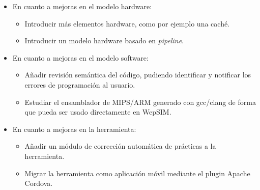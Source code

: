 \begin{itemize}

\item En cuanto a mejoras en el modelo hardware:

\begin{itemize}

\item Introducir más elementos hardware, como por ejemplo una caché.

\item Introducir un modelo hardware basado en \textit{pipeline}. 

\end{itemize}

\item En cuanto a mejoras en el modelo software:

\begin{itemize}

\item Añadir revisión semántica del código, pudiendo identificar y notificar los errores de programación al usuario.

\item Estudiar el ensamblador de MIPS/ARM generado con gcc/clang de forma que pueda ser usado directamente en WepSIM.

\end{itemize}

\item En cuanto a mejoras en la herramienta:

\begin{itemize}

\item Añadir un módulo de corrección automática de prácticas a la herramienta.

\item Migrar la herramienta como aplicación móvil mediante el plugin Apache Cordova.

\end{itemize}

\end{itemize}

